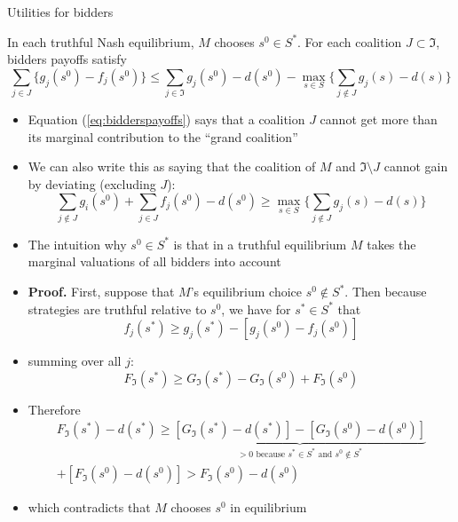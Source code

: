 \documentclass[11pt,english]{beamer}
\begin{document}
\begin{frame}[allowframebreaks]{Utilities for bidders}
  \begin{theorem}
    In each truthful Nash equilibrium, $M$ chooses $s^0 \in S^*$. For
    each coalition $J \subset \Im$, bidders payoffs satisfy
    \begin{equation}
      \label{eq:bidderspayoffs}
      \sum_{j \in J} \{ g_j(s^0) - f_j(s^0) \} \leq \sum_{j \in \Im}
      g_j(s^0) -d(s^0) - \max_{s \in S} \{\sum_{j \notin J} g_j(s) - d(s) \}
    \end{equation}
  \end{theorem}
  \begin{itemize}
  \item Equation (\ref{eq:bidderspayoffs}) says that a coalition $J$
    cannot get more than its marginal contribution to the ``grand coalition''
  \item We can also write this as saying that the coalition of $M$ and
    $\Im \setminus J$ cannot gain by deviating (excluding $J$):
    \begin{equation*}
      \sum_{j \notin J} g_i(s^0) + \sum_{j \in J} f_j(s^0) -d(s^0)
      \geq \max_{s \in S} \{ \sum_{j \notin J} g_j(s) -d(s) \}
    \end{equation*}
  \item The intuition why $s^0 \in S^*$ is that in a truthful
    equilibrium $M$ takes the marginal valuations of all bidders into
    account
  \item \textbf{Proof.} First, suppose that $M$'s equilibrium choice
    $s^0 \notin S^*$. Then because strategies are truthful relative to
    $s^0$, we have for $s^* \in S^*$ that
    \begin{equation*}
      f_j(s^*) \geq g_j(s^*) -[g_j(s^0)-f_j(s^0)]
    \end{equation*}
  \item summing over all $j$:
    \begin{equation*}
      F_{\Im}(s^*) \geq G_{\Im}(s^*) - G_{\Im}(s^0) + F_{\Im}(s^0)
    \end{equation*}
  \item Therefore
    \begin{multline}
      F_{\Im}(s^*)-d(s^*) \geq \underset{>0 \text{ because }s^* \in
        S^*\text{ and } s^0 \notin S^*}{\underbrace{[G_{\Im}(s^*)-d(s^*)]-
          [G_{\Im}(s^0)-d(s^0)]}} \\
      + [F_{\Im}(s^0)-d(s^0)] > F_{\Im}(s^0)-d(s^0)
    \end{multline}
  \item which contradicts that $M$ chooses $s^0$ in equilibrium

\end{itemize}
\end{frame}
\end{document}
